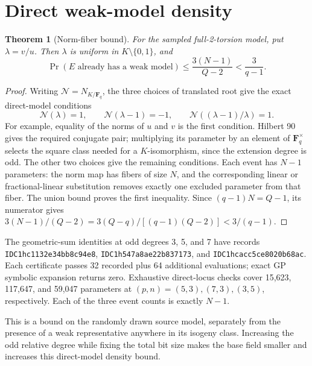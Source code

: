 \documentclass[11pt]{article}
\newtheorem{theorem}{Theorem}
\newcommand{\F}{\mathbf F}
\begin{document}
\section{Direct weak-model density}
\begin{theorem}[Norm-fiber bound]
For the sampled full-2-torsion model, put $\lambda=v/u$.
Then $\lambda$ is uniform in $K\setminus\{0,1\}$, and
\[
 \Pr(E\text{ already has a weak model})
 \le\frac{3(N-1)}{Q-2}<\frac{3}{q-1}.
\]
\end{theorem}
\begin{proof}
Writing $\mathcal N=N_{K/\F_q}$, the three choices of translated root
give the exact direct-model conditions
\[
 \mathcal N(\lambda)=1,\qquad
 \mathcal N(\lambda-1)=-1,\qquad
 \mathcal N((\lambda-1)/\lambda)=1.
\]
For example, equality of the norms of $u$ and $v$ is the first condition.
Hilbert 90 gives the required conjugate pair; multiplying its parameter
by an element of $\F_q^\times$ selects the square class needed for a
$K$-isomorphism, since the extension degree is odd. The other two
choices give the remaining conditions. Each event has $N-1$ parameters:
the norm map has fibers of size $N$, and the corresponding linear or
fractional-linear substitution removes exactly one excluded parameter
from that fiber. The union bound proves the first inequality.
Since $(q-1)N=Q-1$, its numerator gives
$3(N-1)/(Q-2)=3(Q-q)/[(q-1)(Q-2)]<3/(q-1)$.
\end{proof}
The geometric-sum identities at odd degrees 3, 5, and 7 have records
\texttt{IDC1hc1132e34bb8c94e8}, \texttt{IDC1h547a8ae22b837173}, and
\texttt{IDC1hcacc5ce8020b68ac}. Each certificate passes 32 recorded plus
64 additional evaluations; exact GP symbolic expansion returns zero.
Exhaustive direct-locus checks cover 15,623, 117,647, and 59,047
parameters at $(p,n)=(5,3),(7,3),(3,5)$, respectively. Each of the
three event counts is exactly $N-1$.

\begin{center}

\end{center}
This is a bound on the randomly drawn source model, separately from the
presence of a weak representative anywhere in its isogeny class. Increasing
the odd relative degree while fixing the total bit size makes the base
field smaller and increases this direct-model density bound.
\end{document}
